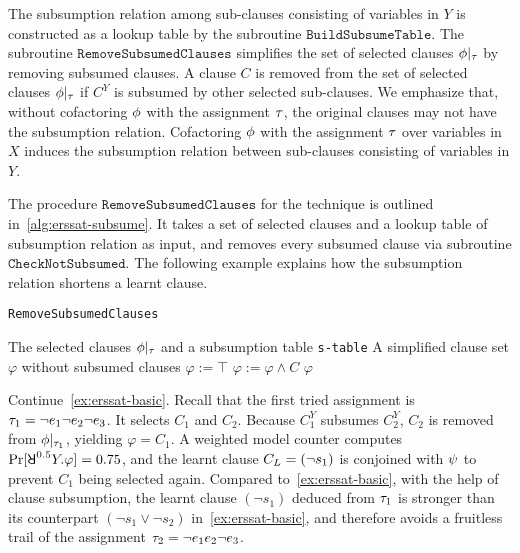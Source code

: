The subsumption relation among sub-clauses consisting of variables in $Y$ is constructed as a lookup table by the subroutine $\mathtt{BuildSubsumeTable}$.
The subroutine $\texttt{RemoveSubsumedClauses}$ simplifies the set of selected clauses $\phi|_{\tau}$ by removing subsumed clauses.
A clause $C$ is removed from the set of selected clauses $\phi|_{\tau}$ if $C^Y$ is subsumed by other selected sub-clauses.
We emphasize that, without cofactoring $\phi$ with the assignment $\tau$,
the original clauses may not have the subsumption relation.
Cofactoring $\phi$ with the assignment $\tau$ over variables in $X$ induces the subsumption relation between sub-clauses consisting of variables in $Y$.

The procedure $\texttt{RemoveSubsumedClauses}$ for the technique is outlined in~\cref{alg:erssat-subsume}.
It takes a set of selected clauses and a lookup table of subsumption relation as input,
and removes every subsumed clause via subroutine $\texttt{CheckNotSubsumed}$.
The following example explains how the subsumption relation shortens a learnt clause.

\begin{algorithm}[p]
    \caption{\texttt{RemoveSubsumedClauses}}
    \label{alg:erssat-subsume}
    \begin{algorithmic}[1]
        \REQUIRE The selected clauses $\phi|_{\tau}$ and a subsumption table \texttt{s-table}
        \ENSURE A simplified clause set $\varphi$ without subsumed clauses
        \STATE $\varphi := \top$
        \STATE $\varphi := \varphi \land C$
        \ENDIF
        \ENDFOR
        \RETURN $\varphi$
    \end{algorithmic}
\end{algorithm}

\begin{example}
    \label{ex:erssat-subsume}
    Continue~\cref{ex:erssat-basic}.
    Recall that the first tried assignment is $\tau_1=\lnot e_1 \lnot e_2 \lnot e_3$.
    It selects $C_1$ and $C_2$.
    Because $C_1^Y$ subsumes $C_2^Y$,
    $C_2$ is removed from $\phi|_{\tau_1}$, yielding $\varphi=C_1$.
    A weighted model counter computes $\spb{\random{0.5}Y.\varphi}=0.75$,
    and the learnt clause $C_L=(\lnot s_{1})$ is conjoined with $\psi$ to prevent $C_1$ being selected again.
    Compared to~\cref{ex:erssat-basic}, with the help of clause subsumption,
    the learnt clause $(\lnot s_1)$ deduced from $\tau_1$ is stronger than its counterpart $(\lnot s_1 \lor \lnot s_2)$ in~\cref{ex:erssat-basic},
    and therefore avoids a fruitless trail of the assignment $\tau_2=\lnot e_1 e_2 \lnot e_3$.
\end{example}

